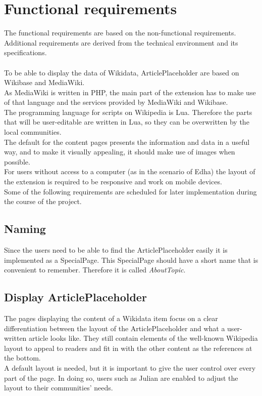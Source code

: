 \chapter {Functional requirements}

The functional requirements are based on the non-functional requirements. Additional requirements are derived from the technical environment and its specifications. \\
\\
To be able to display the data of Wikidata, ArticlePlaceholder are based on Wikibase and MediaWiki. \\
As MediaWiki is written in PHP, the main part of the extension has to make use of that language and the services provided by MediaWiki and Wikibase. \\
The programming language for scripts on Wikipedia is Lua. Therefore the parts that will be user-editable are written in Lua, so they can be overwritten by the local communities. \\
The default for the content pages presents the information and data in a useful way, and to make it visually appealing, it should make use of images when possible. \\
For users without access to a computer (as in the scenario of Edha) the layout of the extension is required to be responsive and work on mobile devices. \\
Some of the following requirements are scheduled for later implementation during the course of the project. 

\section{Naming}
Since the users need to be able to find the ArticlePlaceholder easily it is implemented as a SpecialPage. This SpecialPage should have a short name that is convenient to remember. Therefore it is called \textit{AboutTopic}.

\section{Display ArticlePlaceholder}
The pages displaying the content of a Wikidata item focus on a clear differentiation between the layout of the ArticlePlaceholder and what a user-written article looks like. They still contain elements of the well-known Wikipedia layout to appeal to readers and fit in with the other content as the references at the bottom. \\
A default layout is needed, but it is important to give the user control over every part of the page. In doing so, users such as Julian are enabled to adjust the layout to their communities' needs.

